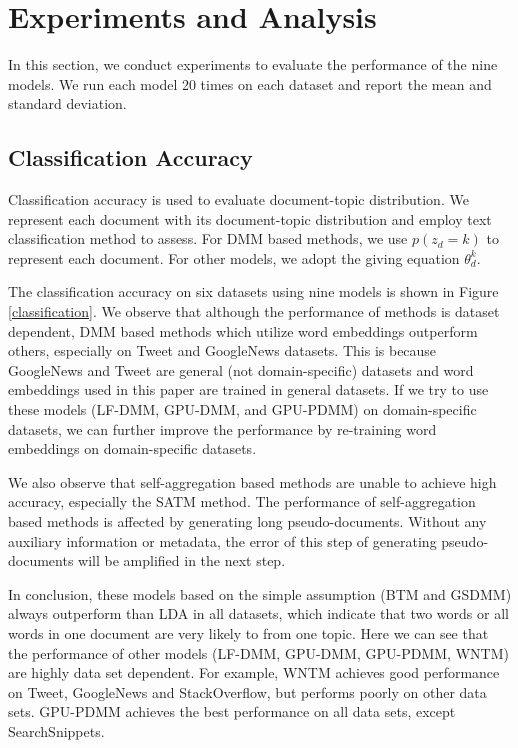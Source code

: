 \documentclass[10pt,journal,compsoc]{IEEEtran}
\begin{document}
{\section{Experiments and Analysis}

In this section, we conduct experiments to evaluate the performance of the nine models. We run each model 20 times on each dataset and report the mean and standard deviation.

\subsection{Classification Accuracy}

Classification accuracy is used to evaluate document-topic distribution. We represent each document with its document-topic distribution and employ text classification method to assess. For DMM based methods, we use $p(z_d=k)$ to represent each document. For other models, we adopt the giving equation $\theta_d^k$. 

The classification accuracy on six datasets using nine models is shown in Figure \ref{classification}. We observe that although the performance of methods is dataset dependent, DMM based methods which utilize word embeddings outperform others, especially on Tweet and GoogleNews datasets. This is because GoogleNews and Tweet are general (not domain-specific) datasets and word embeddings used in this paper are trained in general datasets. If we try to use these models (LF-DMM, GPU-DMM, and GPU-PDMM) on domain-specific datasets, we can further improve the performance by re-training word embeddings on domain-specific datasets. 

We also observe that self-aggregation based methods are unable to achieve high accuracy, especially the SATM method. The performance of self-aggregation based methods is affected by generating long pseudo-documents. Without any auxiliary information or metadata, the error of this step of generating pseudo-documents will be amplified in the next step. 

In conclusion, these models based on the simple assumption (BTM and GSDMM) always outperform than LDA in all datasets, which indicate that two words or all words in one document are very likely to from one topic. Here we can see that the performance of other models (LF-DMM, GPU-DMM, GPU-PDMM, WNTM) are highly data set dependent. For example, WNTM achieves good performance on Tweet, GoogleNews and StackOverflow, but performs poorly on other data sets. GPU-PDMM achieves the best performance
on all data sets, except SearchSnippets. 

}
\end{document}
